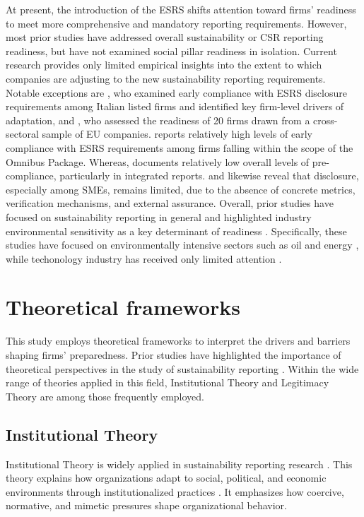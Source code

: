 At present, the introduction of the ESRS shifts attention toward firms' readiness to 
meet more comprehensive and mandatory reporting requirements. However, most prior studies 
have addressed overall sustainability or CSR reporting readiness,
but have not examined social pillar readiness in isolation. Current research provides only 
limited empirical insights into the extent to which companies are adjusting to the new 
sustainability reporting requirements. Notable exceptions are \textcite{Nicolo2025}, who examined early compliance with 
ESRS disclosure requirements among Italian listed firms and identified key firm-level drivers of 
adaptation, and \textcite{Filho2025}, who assessed the readiness of 20 firms drawn from a cross-sectoral 
sample of EU companies. \textcite{Nicolo2025} reports relatively high levels of early compliance 
with ESRS requirements among firms falling within the scope of the Omnibus Package. Whereas, 
\textcite{Raimo2025} documents relatively low overall levels of pre-compliance, 
particularly in integrated reports. \textcite{Filho2025} and \textcite{Montero2025} likewise reveal 
that disclosure, especially among SMEs, remains limited, due to the absence of concrete metrics, 
verification mechanisms, and external assurance. Overall, prior studies have focused on 
sustainability reporting in general and highlighted industry environmental sensitivity 
as a key determinant of readiness \parencite{Filho2025, Raimo2025, Nicolo2025, Montero2025}.
Specifically, these studies have focused on environmentally intensive sectors such as oil and 
energy \parencite{Filho2025, Raimo2025, Nicolo2025}, while techonology industry has received 
only limited attention \parencite{Montero2025}.

\section{Theoretical frameworks}

This study employs theoretical frameworks to interpret the drivers and barriers shaping firms' preparedness.
Prior studies have highlighted the importance of theoretical perspectives 
in the study of sustainability reporting \parencite{Gesso2023, Rezaee2016, Lozano2015}.
Within the wide range of theories applied in this field, Institutional Theory
and Legitimacy Theory are among those frequently employed.

\subsection{Institutional Theory}
Institutional Theory is widely applied in sustainability 
reporting research \parencite{Campbell2007}. This theory explains 
how organizations adapt to social, political, and economic environments 
through institutionalized practices 
\parencite{Meyer1977, DiMaggio1983}.
It emphasizes how coercive, normative, and mimetic pressures shape organizational behavior.

